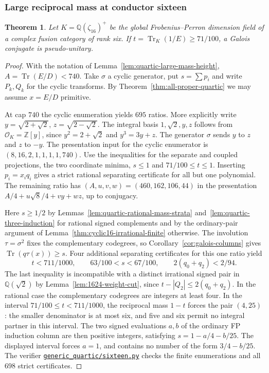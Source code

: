\documentclass[11pt,reqno]{amsart}
\newcommand{\codefile}[1]{\href{https://github.com/sebastienpalcoux/grothendieck-ring-classification/blob/d5750105bb5758f3ad38d2e5464dfcc12c019816/supplements/rank6/sphericality/#1}{\nolinkurl{#1}}}
\newtheorem{theorem}{Theorem}[section]
\theoremstyle{remark}\newtheorem{remark}[theorem]{Remark}
\numberwithin{equation}{section}
\begin{document}
\subsubsection{Large reciprocal mass at conductor sixteen}
\begin{theorem}\label{thm:cyclic-sixteen-large}
Let $K=\mathbb Q(\zeta_{16})^+$ be the global Frobenius--Perron dimension field of a complex fusion category of rank six. If $t=\operatorname{Tr}_K(1/E)\ge71/100$, a Galois conjugate is pseudo-unitary.
\end{theorem}
\begin{proof}
With the notation of Lemma~\ref{lem:quartic-large-mass-height},
$A=\operatorname{Tr}(E/D)<740$. Take $\sigma$ a cyclic generator,
put $s=\sum p_i$ and write $P_k,Q_k$ for the cyclic transforms. By
Theorem~\ref{thm:all-proper-quartic} we may assume $x=E/D$ primitive.

At cap $740$ the cyclic enumeration yields $695$ ratios. More explicitly write $y=\sqrt{2+\sqrt2}$, $z=\sqrt{2-\sqrt2}$. The integral basis $1,\sqrt2,y,z$ follows from $\mathcal O_K=\mathbb Z[y]$, since $y^2=2+\sqrt2$ and $y^3=3y+z$. The generator $\sigma$ sends $y$ to $z$ and $z$ to $-y$. The presentation input for the cyclic enumerator is $(8,16,2,1,1,1,1,740)$. Use the inequalities for the separate and coupled projections, the two coordinate minima, $s\le1$ and $71/100\le t\le1$. Inserting $p_i=x_iq_i$ gives a strict rational separating certificate for all but one polynomial. The remaining ratio has $(A,u,v,w)=(460,162,106,44)$ in the presentation $A/4+u\sqrt8/4+v y+w z$, up to conjugacy.

Here $s\ge1/2$ by Lemmas~\ref{lem:quartic-rational-mass-strata} and~\ref{lem:quartic-three-induction} for rational signed complements and by the ordinary-pair argument of Lemma~\ref{thm:cyclic16-irrational-finite} otherwise. The involution $\tau=\sigma^2$ fixes the complementary codegrees, so
Corollary~\ref{cor:galois-columns} gives
$\operatorname{Tr}(q\tau(x))\ge s$. Four additional separating certificates for this one ratio yield
\[
 t<711/1000,\qquad 63/100<s<67/100,\qquad 2(q_0+q_2)<2/94.
\]
The last inequality is incompatible with a distinct irrational signed pair in $\mathbb Q(\sqrt2)$ by Lemma~\ref{lem:1624-weight-cut}, since $t-|Q_2|\le2(q_0+q_2)$. In the rational case the complementary codegrees are integers at least four. In the interval $71/100\le t<711/1000$, the reciprocal mass $1-t$ forces the pair $(4,25)$: the smaller denominator is at most six, and five and six permit no integral partner in this interval. The two signed evaluations $a,b$ of the ordinary FP induction column are then positive integers, satisfying $s=1-a/4-b/25$. The displayed interval forces $a=1$, and contains no number of the form $3/4-b/25$. The verifier \codefile{generic_quartic/sixteen.py} checks the finite enumerations and all $698$ strict certificates.
\end{proof}
\end{document}
